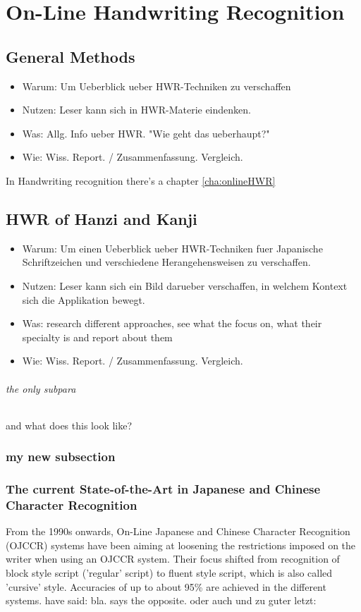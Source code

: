 \chapter{On-Line Handwriting Recognition}
\label{chap:onlinehwr}
  
\section{General Methods}
\label{sec:generalmethods}

\begin{itemize}
\item Warum: Um Ueberblick ueber HWR-Techniken zu verschaffen
\item Nutzen: Leser kann sich in HWR-Materie eindenken.
\item Was: Allg. Info ueber HWR. "Wie geht das ueberhaupt?"
\item Wie: Wiss. Report. / Zusammenfassung. Vergleich.
\end{itemize}

In Handwriting recognition there's a chapter \ref{cha:onlineHWR} 

\section{HWR of Hanzi and Kanji}
\begin{itemize}
\item Warum: Um einen Ueberblick ueber HWR-Techniken fuer Japanische 
  Schriftzeichen und verschiedene Herangehensweisen zu verschaffen.
\item Nutzen: Leser kann sich ein Bild darueber verschaffen,
  in welchem Kontext sich die Applikation bewegt.
\item Was: research different approaches, see what the focus on, 
  what their specialty is and report about them
\item Wie: Wiss. Report. / Zusammenfassung. Vergleich.
\end{itemize}

\subparagraph{the only subpara}

and what does this look like?

\subsection{my new subsection}
\label{sec:mynewsub}


\subsection{The current State-of-the-Art in Japanese and Chinese Character Recognition}
From the 1990s onwards, On-Line Japanese and Chinese Character Recognition 
(OJCCR) systems have been aiming at loosening the restrictions imposed on 
the writer when using an OJCCR system. Their focus shifted from recognition 
of block style script ('regular' script) to fluent style script, 
which is also called 'cursive' style. Accuracies of up to about 95\% are
achieved in the different systems. \cite{LiuJaegerNakagawa2004} have said: 
bla. \cite{Tappert1990} says the opposite. \cite{ChenLee1996} oder auch 
\cite{Nakagawa2008} und \cite{Nakai2003} zu guter letzt: \cite{Santosh2009}


